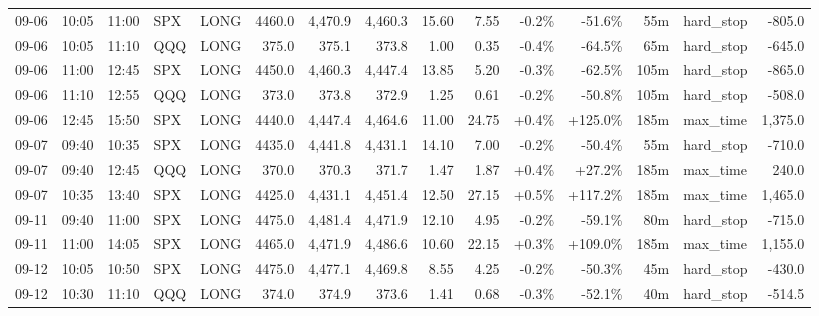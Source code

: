 \documentclass[11pt,a4paper,twoside]{article}
\begin{document}
\begin{landscape}
\begin{center}
\begin{longtable}{>{\color{txtmain}}l l l l l r r r r r r r r >{\color{txtmain}}l r}
09-06 & 10:05 & 11:00 & SPX & LONG & 4460.0 & 4,470.9 & 4,460.3 & 15.60 & 7.55 & \textcolor{lossred}{-0.2\%} & \textcolor{lossred}{-51.6\%} & 55m & hard\_stop & \textcolor{lossred}{-805.0} \\
09-06 & 10:05 & 11:10 & QQQ & LONG & 375.0 & 375.1 & 373.8 & 1.00 & 0.35 & \textcolor{lossred}{-0.4\%} & \textcolor{lossred}{-64.5\%} & 65m & hard\_stop & \textcolor{lossred}{-645.0} \\
09-06 & 11:00 & 12:45 & SPX & LONG & 4450.0 & 4,460.3 & 4,447.4 & 13.85 & 5.20 & \textcolor{lossred}{-0.3\%} & \textcolor{lossred}{-62.5\%} & 105m & hard\_stop & \textcolor{lossred}{-865.0} \\
09-06 & 11:10 & 12:55 & QQQ & LONG & 373.0 & 373.8 & 372.9 & 1.25 & 0.61 & \textcolor{lossred}{-0.2\%} & \textcolor{lossred}{-50.8\%} & 105m & hard\_stop & \textcolor{lossred}{-508.0} \\
09-06 & 12:45 & 15:50 & SPX & LONG & 4440.0 & 4,447.4 & 4,464.6 & 11.00 & 24.75 & \textcolor{wingreen}{+0.4\%} & \textcolor{wingreen}{+125.0\%} & 185m & max\_time & \textcolor{wingreen}{1,375.0} \\
09-07 & 09:40 & 10:35 & SPX & LONG & 4435.0 & 4,441.8 & 4,431.1 & 14.10 & 7.00 & \textcolor{lossred}{-0.2\%} & \textcolor{lossred}{-50.4\%} & 55m & hard\_stop & \textcolor{lossred}{-710.0} \\
09-07 & 09:40 & 12:45 & QQQ & LONG & 370.0 & 370.3 & 371.7 & 1.47 & 1.87 & \textcolor{wingreen}{+0.4\%} & \textcolor{wingreen}{+27.2\%} & 185m & max\_time & \textcolor{wingreen}{240.0} \\
09-07 & 10:35 & 13:40 & SPX & LONG & 4425.0 & 4,431.1 & 4,451.4 & 12.50 & 27.15 & \textcolor{wingreen}{+0.5\%} & \textcolor{wingreen}{+117.2\%} & 185m & max\_time & \textcolor{wingreen}{1,465.0} \\
09-11 & 09:40 & 11:00 & SPX & LONG & 4475.0 & 4,481.4 & 4,471.9 & 12.10 & 4.95 & \textcolor{lossred}{-0.2\%} & \textcolor{lossred}{-59.1\%} & 80m & hard\_stop & \textcolor{lossred}{-715.0} \\
09-11 & 11:00 & 14:05 & SPX & LONG & 4465.0 & 4,471.9 & 4,486.6 & 10.60 & 22.15 & \textcolor{wingreen}{+0.3\%} & \textcolor{wingreen}{+109.0\%} & 185m & max\_time & \textcolor{wingreen}{1,155.0} \\
09-12 & 10:05 & 10:50 & SPX & LONG & 4475.0 & 4,477.1 & 4,469.8 & 8.55 & 4.25 & \textcolor{lossred}{-0.2\%} & \textcolor{lossred}{-50.3\%} & 45m & hard\_stop & \textcolor{lossred}{-430.0} \\
09-12 & 10:30 & 11:10 & QQQ & LONG & 374.0 & 374.9 & 373.6 & 1.41 & 0.68 & \textcolor{lossred}{-0.3\%} & \textcolor{lossred}{-52.1\%} & 40m & hard\_stop & \textcolor{lossred}{-514.5} \\

\end{longtable}
\end{center}
\end{landscape}
\end{document}
